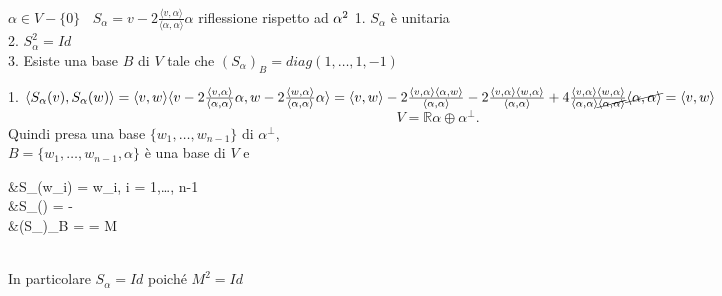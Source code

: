 \documentclass[12px]{article}
\begin{document}
	\hline \ \\
	\begin{prop}
$\displaystyle\alpha\in V\minus \{0\}  \ \ \ \ S_\alpha = v-2\frac{ \langle v, \alpha \rangle }{ \langle \alpha,\alpha \rangle} \alpha$ riflessione rispetto ad $\alpha^2\\$
1. $S_\alpha$ è unitaria\\
2. $S_\alpha^2 = Id$\\
3. Esiste una base $B$ di $V$ tale che 
$(S_\alpha)_B = diag(1,\ldots, 1, -1)$
\end{prop}
\begin{dimo}
	1. $ \langle S_\alpha (v), S_\alpha (w) \rangle  = \langle v, w \rangle \\
	\langle v -2\frac{ \langle v, \alpha \rangle }{ \langle \alpha,\alpha \rangle} \alpha,w  -2\frac{ \langle w, \alpha \rangle }{ \langle \alpha,\alpha \rangle} \alpha  \rangle  = \\
	\langle v, w \rangle   -2\frac{ \langle v, \alpha \rangle \langle \alpha, w \rangle }{ \langle \alpha,\alpha \rangle} -2\frac{ \langle v, \alpha \rangle \langle w, \alpha \rangle }{ \langle \alpha,\alpha \rangle}  + 4\frac{ \langle v, \alpha \rangle \langle w, \alpha \rangle }{ \langle \alpha,\alpha \rangle \cancel{\langle \alpha, \alpha \rangle} } \cancel{\langle \alpha, \alpha \rangle } = \langle v, w \rangle $\\
	\[
		V = \mathbb{R}\alpha \oplus \alpha^\perp
	.\] 
	Quindi presa una base $\{w_1,\ldots, w_{n-1}\}$ di $\alpha^\perp,$\\
	$B = \{w_1,\ldots,w_{n-1},\alpha\}  $ è una base di $V$ e\\
	\begin{aligned}
		&S_\alpha(w_i) = w_i, i = 1,\ldots, n-1\\
		&S_\alpha(\alpha) = -\alpha\\
		&(S_\alpha)_B =  = M
	\end{aligned}\\
	In particolare $S_\alpha = Id$ poiché $M^2 = Id$
\end{dimo}
\end{document}

